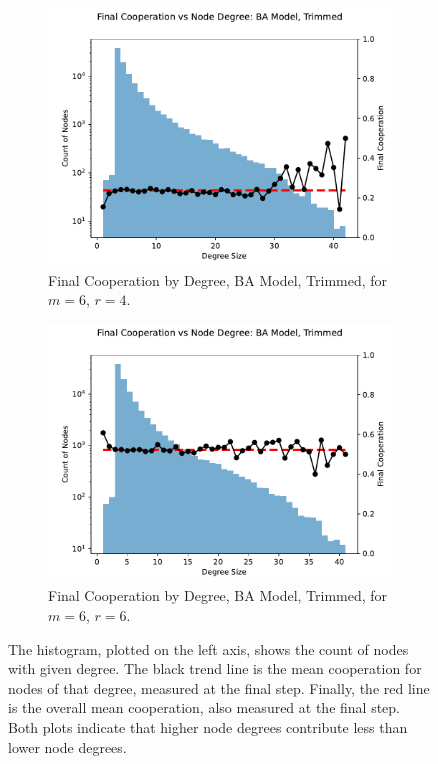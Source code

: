 \FloatBarrier 
\begin{figure}[!h]
  \begin{subfigure}[b]{0.45\textwidth}
    \includegraphics[width=1.1\textwidth]{images/Rep_BA_node_groups_m_6_phi_4_trimmed.pdf}
    \caption{Final Cooperation by Degree, BA Model, Trimmed, for $m=6$, $r=4$.   }
    \label{ID_by_degree_m_6_phi_4}
  \end{subfigure}
  \hfill
  \begin{subfigure}[b]{0.45\textwidth}
    \includegraphics[width=1.1\textwidth]{images/ID_BA_node_groups_m_6_phi_6_trimmed.pdf}
    \caption{Final Cooperation by Degree, BA Model, Trimmed, for $m=6$, $r=6$. }
    \label{ID_by_degree_m_6_phi_6}
  \end{subfigure}
  \caption{The histogram, plotted on the left axis, shows the count of nodes with given degree. The black trend line is the mean cooperation for nodes of that degree, measured at the final step. Finally, the red line is the overall mean cooperation, also measured at the final step. Both plots indicate that higher node degrees contribute less than lower node degrees.} \label{ID_by_degree_m_6}
\end{figure} 
\FloatBarrier


